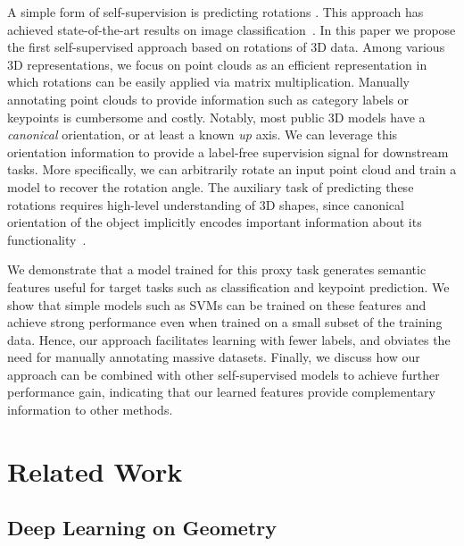 \documentclass[10pt,twocolumn,letterpaper]{article}
\begin{document}
A simple form of self-supervision is predicting rotations \cite{gidaris2018unsupervised}. This approach has achieved state-of-the-art results on image classification~\cite{kolesnikov2019revisiting}. In this paper we propose the first self-supervised approach based on rotations of 3D data. 
Among various 3D representations, we focus on point clouds as an efficient representation in which rotations can be easily applied via matrix multiplication. 
Manually annotating point clouds to provide information such as category labels or keypoints is cumbersome and costly. Notably, most public 3D models have a \textit{canonical} orientation, or at least a known \textit{up} axis. We can leverage this orientation information to provide a label-free supervision signal for downstream tasks. More specifically, we can arbitrarily rotate an input point cloud and train a model to recover the rotation angle. 
The auxiliary task of predicting these rotations requires high-level understanding of 3D shapes, since canonical orientation of the object implicitly encodes important information about its functionality~\cite{Fu2008upright}.


We demonstrate that a model trained for this proxy task generates semantic features useful for target tasks such as classification and keypoint prediction. 
We show that simple models such as SVMs can be trained on these features and achieve strong performance even when trained on a small subset of the training data. Hence, our approach facilitates learning with fewer labels, and obviates the need for manually annotating massive datasets. Finally, we discuss how our approach can be combined with other self-supervised models to achieve further performance gain, indicating that our
learned features provide complementary information to other methods.  

\section{Related Work}

\subsection{Deep Learning on Geometry}
\end{document}
